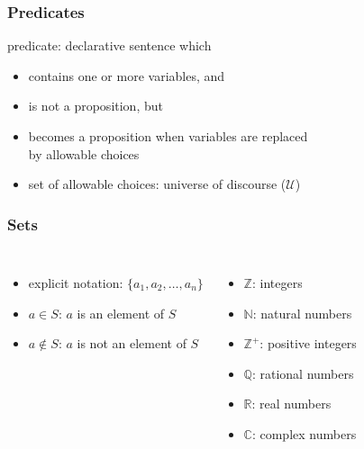 \documentclass[dvipsnames]{beamer}
\begin{document}
\begin{frame}
  \frametitle{Predicates}

  \begin{definition}
    \alert{predicate}: declarative sentence which
    \begin{itemize}
      \item contains one or more variables, and
      \item is not a proposition, but
      \item becomes a proposition when variables are replaced\\
        by allowable choices
    \end{itemize}
  \end{definition}

  \begin{itemize}
    \item set of allowable choices: \alert{universe of discourse} ($\mathcal{U}$)
  \end{itemize}
\end{frame}

\begin{frame}
  \frametitle{Sets}

  \begin{columns}[t]
    \begin{itemize}
      \item explicit notation: $\{a_1,a_2,\dots,a_n\}$

      \medskip
      \item $a \in S$: $a$ is an element of $S$
      \item $a \notin S$: $a$ is not an element of $S$
    \end{itemize}

    \pause
    \begin{itemize}
      \item $\mathbb{Z}$: integers
      \item $\mathbb{N}$: natural numbers
      \item $\mathbb{Z}^+$: positive integers
      \item $\mathbb{Q}$: rational numbers
      \item $\mathbb{R}$: real numbers
      \item $\mathbb{C}$: complex numbers
    \end{itemize}
  \end{columns}
\end{frame}
\end{document}
